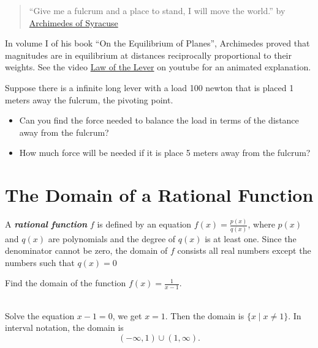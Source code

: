 \documentclass[
  en,11pt]{elegantbook}
\newcommand{\size}[2]{{\fontsize{#1}{0}\selectfont#2}}
\newenvironment{rmdthink}{
	\vspace*{0.5\baselineskip}
	\par\noindent
	\makebox[-4pt][r]{\color{green!90}\size{12}{\faLightbulbO}\,\,}
    \begin{tcolorbox}[
    enhanced,
    title={\textbf{\color{second}Think}},
    title style={left color=blue!10!green!20!white,right color=yellow!20!blue!20!white},
    colback=green!20!white,
    ]
    \sffamily
}{
    \end{tcolorbox}
	\par\ignorespacesafterend
}
\let\BeginKnitrBlock\begin \let\EndKnitrBlock\end
\begin{document}
\begin{rmdthink}

\begin{quote}
``Give me a fulcrum and a place to stand, I will move the world.'' by \href{https://en.wikipedia.org/wiki/Archimedes\#Mathematics}{Archimedes of Syracuse}
\end{quote}

In volume I of his book ``On the Equilibrium of Planes'', Archimedes proved that magnitudes are in equilibrium at distances reciprocally proportional to their weights. See the video \href{https://youtu.be/yhrR4384SGE?t=8}{Law of the Lever} on youtube for an animated explanation.

Suppose there is a infinite long lever with a load 100 newton that is placed 1 meters away the fulcrum, the pivoting point.

\begin{itemize}

\item
  Can you find the force needed to balance the load in terms of the distance away from the fulcrum?
\item
  How much force will be needed if it is place 5 meters away from the fulcrum?
\end{itemize}

\end{rmdthink}

\hypertarget{the-domain-of-a-rational-function}{%
\section{The Domain of a Rational Function}\label{the-domain-of-a-rational-function}}

A \textbf{\emph{rational function}} \(f\) is defined by an equation \(f(x)=\frac{p(x)}{q(x)}\), where \(p(x)\) and \(q(x)\) are polynomials and the degree of \(q(x)\) is at least one. Since the denominator cannot be zero, the domain of \(f\) consists all real numbers except the numbers such that \(q(x)=0\)

\BeginKnitrBlock{example}
\protect\hypertarget{exm:unnamed-chunk-275}{}{\label{exm:unnamed-chunk-275} }
Find the domain of the function \(f(x)=\frac{1}{x-1}\).
\EndKnitrBlock{example}

\BeginKnitrBlock{solution}
{}\\

Solve the equation \(x-1=0\), we get \(x=1\). Then the domain is \(\{x\mid x\neq 1\}\). In interval notation, the domain is
\[
(-\infty, 1)\cup (1,\infty).
\]
\EndKnitrBlock{solution}
\end{document}
